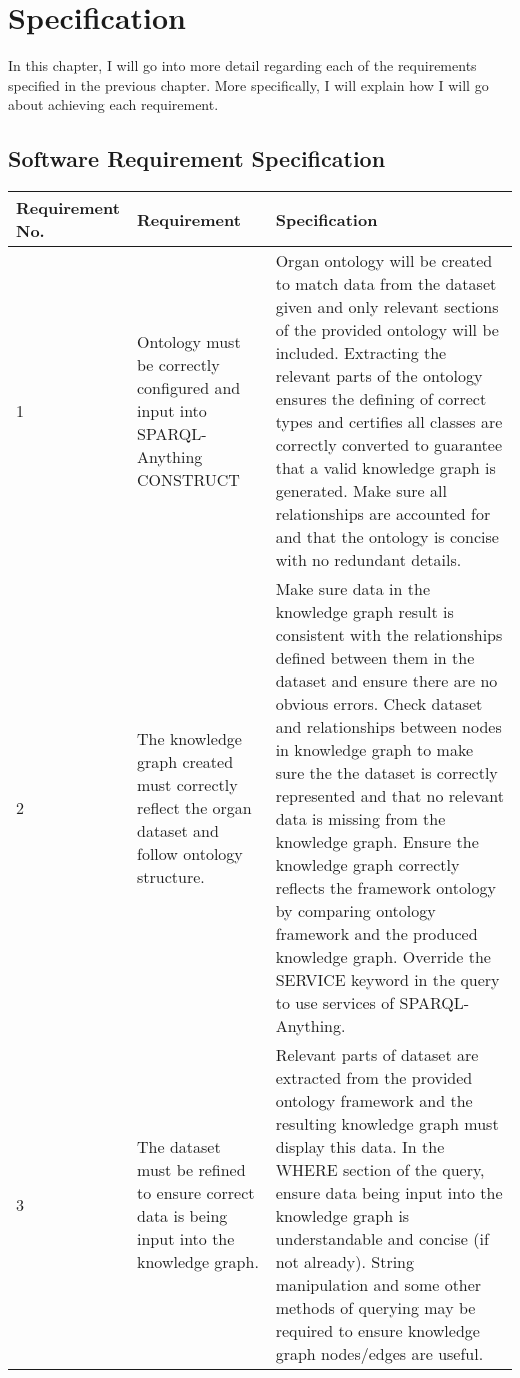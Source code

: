 \chapter{Specification}
In this chapter, I will go into more detail regarding each of the requirements specified in the previous chapter. More specifically, I will explain how I will go about achieving each requirement. 

\section{Software Requirement Specification}
\begin{longtable}{|p{2.25cm}|p{5.5cm}|p{5.5cm}|}
\hline
\textbf{Requirement No.} & \textbf{Requirement} & \textbf{Specification}\\
\hline

1& 
Ontology must be correctly configured and input into SPARQL-Anything CONSTRUCT &
Organ ontology will be created to match data from the dataset given and only relevant sections of the provided ontology will be included. Extracting the relevant parts of the ontology ensures the defining of correct types and certifies all classes are correctly converted to guarantee that a valid knowledge graph is generated. Make sure all relationships are accounted for and that the ontology is concise with no redundant details. \\
\hline

2&
The knowledge graph created must correctly reflect the organ dataset and follow ontology structure. &
Make sure data in the knowledge graph result is consistent with the relationships defined between them in the dataset and ensure there are no obvious errors. Check dataset and relationships between nodes in knowledge graph to make sure the the dataset is correctly represented and that no relevant data is missing from the knowledge graph. Ensure the knowledge graph correctly reflects the framework ontology by comparing ontology framework and the produced knowledge graph. Override the SERVICE keyword in the query to use services of SPARQL-Anything. \\
\hline

3&
The dataset must be refined to ensure correct data is being input into the knowledge graph. &
Relevant parts of dataset are extracted from the provided ontology framework and the resulting knowledge graph must display this data. In the WHERE section of the query, ensure data being input into the knowledge graph is understandable and concise (if not already). String manipulation and some other methods of querying may be required to ensure knowledge graph nodes/edges are useful. \\
\hline


\end{longtable}
